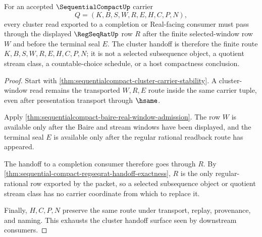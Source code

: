 \begin{theorem}
\label{thm:sequentialcompact-regseqrat-cluster-handoff}
For an accepted $\SequentialCompactUp$ carrier
$$
Q=(K,B,S,W,R,E,H,C,P,N),
$$
every cluster read exported to a completion or Real-facing consumer must pass through the displayed $\RegSeqRatUp$ row $R$ after the finite selected-window row $W$ and before the terminal seal $E$. The cluster handoff is therefore the finite route $K,B,S,W,R,E,H,C,P,N$; it is not a selected subsequence object, a quotient stream class, a countable-choice schedule, or a host compactness conclusion.
\end{theorem}
\begin{proof}
Start with \autoref{thm:sequentialcompact-cluster-carrier-stability}. A cluster-window read remains the transported $W,R,E$ route inside the same carrier tuple, even after presentation transport through $\hsame$.

Apply \autoref{thm:sequentialcompact-baire-real-window-admission}. The row $W$ is available only after the Baire and stream windows have been displayed, and the terminal seal $E$ is available only after the regular rational readback route has appeared.

The handoff to a completion consumer therefore goes through $R$. By \autoref{thm:sequential-compact-regseqrat-handoff-exactness}, $R$ is the only regular-rational row exported by the packet, so a selected subsequence object or quotient stream class has no carrier coordinate from which to replace it.

Finally, $H,C,P,N$ preserve the same route under transport, replay, provenance, and naming. This exhausts the cluster handoff surface seen by downstream consumers.
\end{proof}

